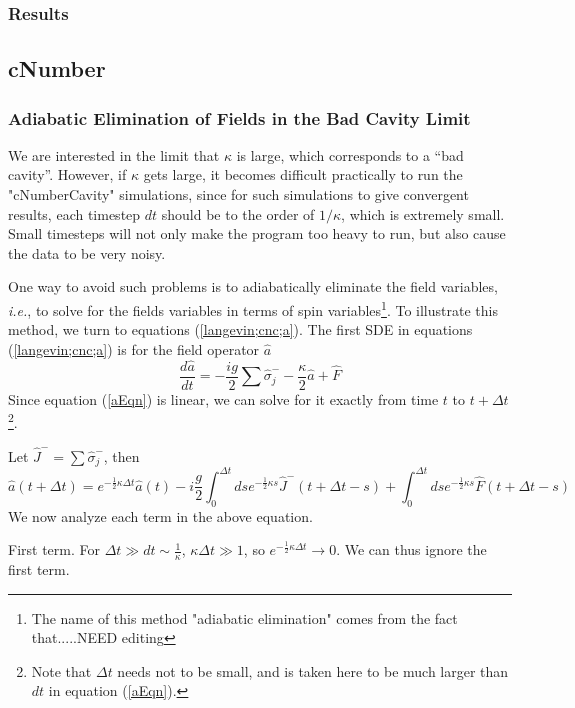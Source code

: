 \documentclass{article}
\begin{document}
\subsubsection{Results}





\subsection{cNumber}
\subsubsection{Adiabatic Elimination of Fields in the Bad Cavity Limit}
We are interested in the limit that $\kappa$ is large, which corresponds to a ``bad cavity''. However, if $\kappa$ gets large, it becomes difficult practically to run the "cNumberCavity" simulations, since for such simulations to give convergent results, each timestep $dt$ should be to the order of $1/\kappa$, which is extremely small. Small timesteps will not only make the program too heavy to run, but also cause the data to be very noisy. 

One way to avoid such problems is to adiabatically eliminate the field variables, \textit{i.e.}, to solve for the fields variables in terms of spin variables\footnote{The name of this method "adiabatic elimination" comes from the fact that.....NEED editing}. To illustrate this method, we turn to equations (\ref{langevin;cnc;a}). The first SDE in equations (\ref{langevin;cnc;a}) is for the field operator $\hat{a}$
\begin{equation}
     \label{aEqn}
     \frac{d \hat{a}}{dt} = -\frac{ig}{2}\sum\hat{\sigma}_j^--\frac{\kappa}{2}\hat{a}+\hat{F}
\end{equation}
Since equation (\ref{aEqn}) is linear, we can solve for it exactly from time $t$ to $t+\Delta t$\footnote{Note that $\Delta t$ needs not to be small, and is taken here to be much larger than $dt$ in equation (\ref{aEqn}).}. 

Let $\hat{J}^-=\sum \hat{\sigma}_j^-$, then
\begin{equation}
\label{aEqn2}
    \hat{a}(t+\Delta t) = e^{-\frac{1}{2}\kappa \Delta t}\hat{a}(t)-i\frac{g}{2}\int_0^{\Delta t} ds e^{-\frac{1}{2}\kappa s}\hat{J}^-(t+\Delta t-s)+\int_0^{\Delta t} ds e^{-\frac{1}{2}\kappa s} \hat{F}(t+\Delta t-s)
\end{equation}
We now analyze each term in the above equation.

First term. For $\Delta t \gg dt \sim \frac{1}{\kappa}$, $\kappa \Delta t \gg 1$, so $e^{-\frac{1}{2}\kappa \Delta t}\rightarrow 0$. We can thus ignore the first term.
\end{document}
